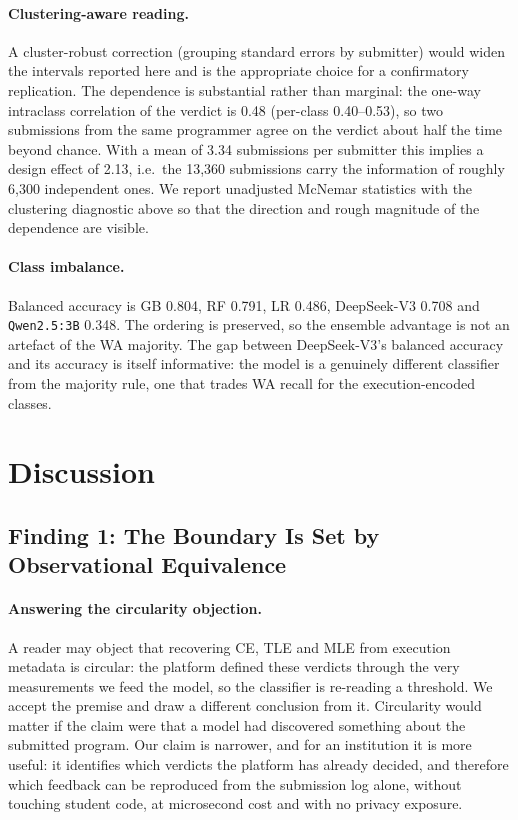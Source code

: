 \documentclass[acmsmall]{acmart}
\begin{document}
\paragraph{Clustering-aware reading.} A cluster-robust correction (grouping
standard errors by submitter) would widen the intervals reported here and is
the appropriate choice for a confirmatory replication. The dependence is
substantial rather than marginal: the one-way intraclass correlation of the
verdict is 0.48 (per-class 0.40--0.53), so two submissions from the same
programmer agree on the verdict about half the time beyond chance. With a mean
of 3.34 submissions per submitter this implies a design effect of 2.13, i.e.\
the 13{,}360 submissions carry the information of roughly 6{,}300 independent
ones. We report unadjusted McNemar statistics with the clustering diagnostic
above so that the direction and rough magnitude of the dependence are visible.

\paragraph{Class imbalance.} Balanced accuracy is GB 0.804, RF 0.791, LR 0.486, DeepSeek-V3 0.708 and
\texttt{Qwen2.5:3B} 0.348. The ordering is preserved, so the ensemble advantage
is not an artefact of the WA majority. The gap between DeepSeek-V3's balanced
accuracy and its accuracy is itself informative: the model is a genuinely
different classifier from the majority rule, one that trades WA recall for the
execution-encoded classes.

\section{Discussion}

\subsection{Finding 1: The Boundary Is Set by Observational Equivalence}\label{sec:platform-encoding}

\paragraph{Answering the circularity objection.} A reader may object that
recovering CE, TLE and MLE from execution metadata is circular: the platform
defined these verdicts through the very measurements we feed the model, so the
classifier is re-reading a threshold. We accept the premise and draw a
different conclusion from it. Circularity would matter if the claim were that a
model had discovered something about the submitted program. Our claim is
narrower, and for an institution it is more useful: it identifies which verdicts
the platform has already decided, and therefore which feedback can be
reproduced from the submission log alone, without touching student code, at
microsecond cost and with no privacy exposure.
\end{document}
